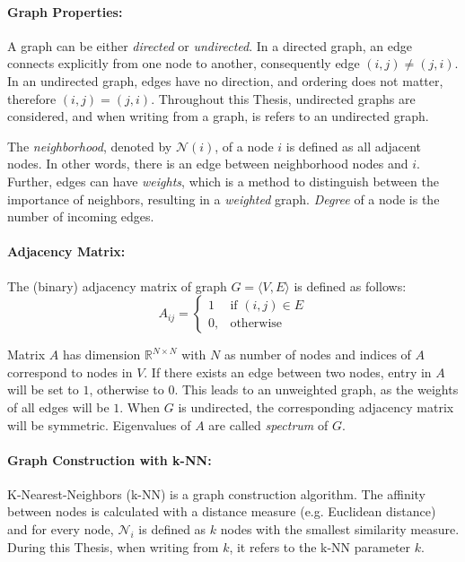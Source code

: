 \paragraph{Graph Properties:}
A graph can be either \textit{directed} or \textit{undirected}. 
In a directed graph, an edge connects explicitly from one node to another, consequently edge $(i, j) \neq (j, i)$. 
In an undirected graph, edges have no direction, and ordering does not matter, therefore $(i, j) = (j, i)$.
Throughout this Thesis, undirected graphs are considered, and when writing from a graph, is refers to an undirected graph.

The \textit{neighborhood}, denoted by $\mathcal{N}(i)$, of a node $i$  is defined as all adjacent nodes.
In other words, there is an edge between neighborhood nodes and $i$. 
Further, edges can have \textit{weights}, which is a method to distinguish between the importance of neighbors, resulting in a \textit{weighted} graph.
\textit{Degree} of a node is the number of incoming edges.

\paragraph{Adjacency Matrix:}
The (binary) adjacency matrix of graph $G = \langle V, E \rangle$ is defined as follows:
\begin{equation}
    \label{eg:AdjacencyMatrix}
    A_{ij} =    
    \begin{cases}
        1  & \text{if } (i, j) \in E \\
        0, & \text{otherwise}
    \end{cases}
\end{equation}

Matrix $A$ has dimension $\mathbb{R}^{N \times N}$ with $N$ as number of nodes
and indices of $A$ correspond to nodes in $V$.
If there exists an edge between two nodes, entry in $A$ will be set to $1$, otherwise to $0$.
This leads to an unweighted graph, as the weights of all edges will be $1$.
When $G$ is undirected, the corresponding adjacency matrix will be symmetric. 
Eigenvalues of $A$ are called \textit{spectrum} of $G$.

\paragraph{Graph Construction with k-NN:}
K-Nearest-Neighbors (k-NN) is a graph construction algorithm. The affinity between
nodes is calculated with a distance measure (e.g. Euclidean distance) and 
for every node, $\mathcal{N}_i$ is defined as $k$ nodes with the smallest similarity measure.
During this Thesis, when writing from $k$, it refers to the k-NN parameter $k$.

